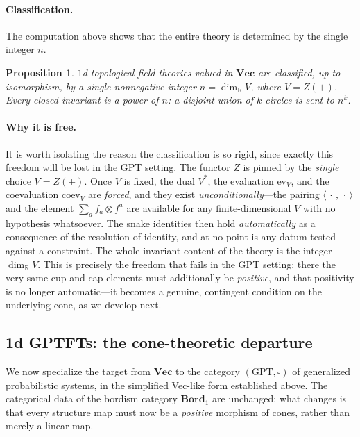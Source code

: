 \documentclass[prl,aps,10pt,superscriptaddress, floatfix]{revtex4-2}
\newtheorem{prop}{Proposition}
\begin{document}
\paragraph{Classification.}
The computation above shows that the entire theory is determined by the single integer $n$.

\begin{prop}
$1$d topological field theories valued in $\mathbf{Vec}$ are classified, up to isomorphism, by a single nonnegative integer $n=\dim_{\mathbb R}V$, where $V=Z(+)$. Every closed invariant is a power of $n$: a disjoint union of $k$ circles is sent to $n^k$.
\end{prop}

\paragraph{Why it is free.}
It is worth isolating the reason the classification is so rigid, since exactly this freedom will be lost in the GPT setting. The functor $Z$ is pinned by the \emph{single} choice $V=Z(+)$. Once $V$ is fixed, the dual $V^*$, the evaluation $\mathrm{ev}_V$, and the coevaluation $\mathrm{coev}_V$ are \emph{forced}, and they exist \emph{unconditionally}---the pairing $\langle\,\cdot\,,\,\cdot\,\rangle$ and the element $\sum_a f_a\otimes f^a$ are available for any finite-dimensional $V$ with no hypothesis whatsoever. The snake identities then hold \emph{automatically} as a consequence of the resolution of identity, and at no point is any datum tested against a constraint. The whole invariant content of the theory is the integer $\dim_{\mathbb R}V$. This is precisely the freedom that fails in the GPT setting: there the very same cup and cap elements must additionally be \emph{positive}, and that positivity is no longer automatic---it becomes a genuine, contingent condition on the underlying cone, as we develop next.

\subsection{1d GPTFTs: the cone-theoretic departure}

We now specialize the target from $\mathbf{Vec}$ to the category $(\mathrm{GPT},\square)$ of generalized probabilistic systems, in the simplified Vec-like form established above. The categorical data of the bordism category $\mathbf{Bord}_1$ are unchanged; what changes is that every structure map must now be a \emph{positive} morphism of cones, rather than merely a linear map.
\end{document}
